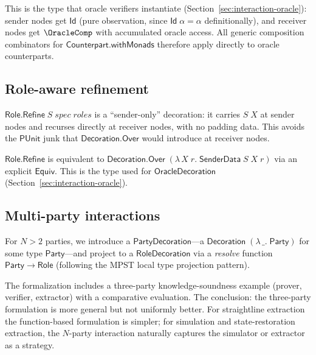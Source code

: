 This is the type that oracle verifiers instantiate (Section~\ref{sec:interaction-oracle}):
sender nodes get $\mathsf{Id}$ (pure observation, since $\mathsf{Id}\;\alpha =
\alpha$ definitionally), and receiver nodes get $\OracleComp$ with accumulated
oracle access.  All generic composition combinators for
$\mathsf{Counterpart.withMonads}$ therefore apply directly to oracle
counterparts.

\subsection{Role-aware refinement}

\begin{definition}
  \label{int:role-refine}
  $\mathsf{Role.Refine}\;S\;\mathit{spec}\;\mathit{roles}$ is a
  ``sender-only'' decoration: it carries $S\;X$ at sender nodes and recurses
  directly at receiver nodes, with no padding data.  This avoids the
  $\mathsf{PUnit}$ junk that $\mathsf{Decoration.Over}$ would introduce at
  receiver nodes.
\end{definition}

$\mathsf{Role.Refine}$ is equivalent to
$\mathsf{Decoration.Over}\;(\lambda\,X\;r.\;\mathsf{SenderData}\;S\;X\;r)$
via an explicit $\mathsf{Equiv}$.  This is the type used for
$\mathsf{OracleDecoration}$ (Section~\ref{sec:interaction-oracle}).

\subsection{Multi-party interactions}

For $N > 2$ parties, we introduce a $\mathsf{PartyDecoration}$---a
$\mathsf{Decoration}\;(\lambda\,\_.\;\mathsf{Party})$ for some type
$\mathsf{Party}$---and project to a $\mathsf{RoleDecoration}$ via a
\emph{resolve} function $\mathsf{Party} \to \mathsf{Role}$ (following the
MPST local type projection pattern).

The formalization includes a three-party knowledge-soundness example (prover,
verifier, extractor) with a comparative evaluation.  The conclusion: the
three-party formulation is more general but not uniformly better.  For
straightline extraction the function-based formulation is simpler; for
simulation and state-restoration extraction, the $N$-party interaction
naturally captures the simulator or extractor as a strategy.
